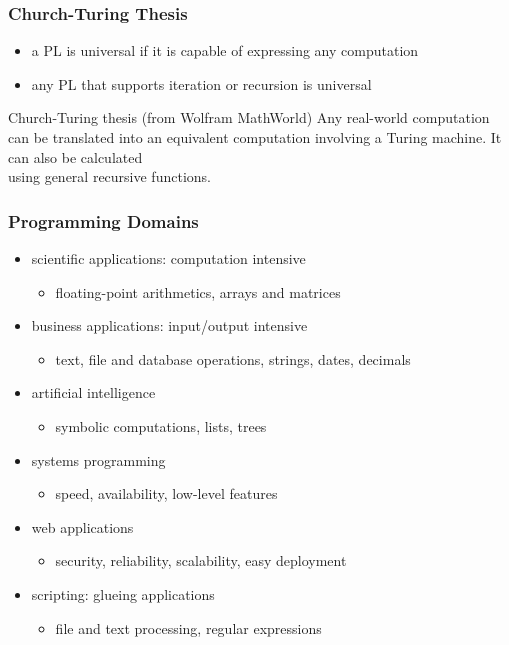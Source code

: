 \documentclass[dvipsnames]{beamer}
\theoremstyle{plain}
\begin{document}
\begin{frame}
  \frametitle{Church-Turing Thesis}

  \begin{itemize}
    \item a PL is \alert{universal}
      if it is capable of expressing any computation
    \item any PL that supports iteration or recursion is universal
  \end{itemize}

  \pause
  \medskip
  \begin{block}{Church-Turing thesis (from Wolfram MathWorld)}
    Any real-world computation can be translated into an equivalent computation
    involving a Turing machine. It can also be calculated\\
    using general recursive functions.
  \end{block}
\end{frame}

\begin{frame}
  \frametitle{Programming Domains}

  \begin{itemize}
    \item scientific applications: computation intensive
    \begin{itemize}
      \item floating-point arithmetics, arrays and matrices
    \end{itemize}

    \item business applications: input/output intensive
    \begin{itemize}
      \item text, file and database operations, strings, dates, decimals
    \end{itemize}

    \item artificial intelligence
    \begin{itemize}
      \item symbolic computations, lists, trees
    \end{itemize}

    \item systems programming
    \begin{itemize}
      \item speed, availability, low-level features
    \end{itemize}

    \item web applications
    \begin{itemize}
      \item security, reliability, scalability, easy deployment
    \end{itemize}

    \item scripting: glueing applications
    \begin{itemize}
      \item file and text processing, regular expressions
    \end{itemize}
  \end{itemize}
\end{frame}
\end{document}
